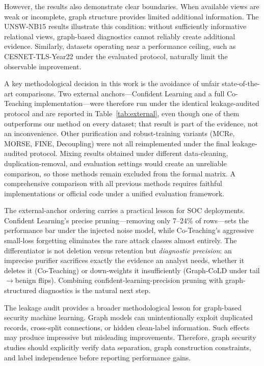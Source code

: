 \documentclass[preprint,3p,times]{elsarticle}
\begin{document}
However, the results also demonstrate clear boundaries. When available views
are weak or incomplete, graph structure provides limited additional information.
The UNSW-NB15 results illustrate this condition: without sufficiently
informative relational views, graph-based diagnostics cannot reliably create
additional evidence. Similarly, datasets operating near a performance ceiling,
such as CESNET-TLS-Year22 under the evaluated protocol, naturally limit the
observable improvement.

A key methodological decision in this work is the avoidance of unfair
state-of-the-art comparisons. Two external anchors---Confident Learning and a
full Co-Teaching implementation---were therefore run under the identical
leakage-audited protocol and are reported in Table~\ref{tab:external}, even
though one of them outperforms our method on every dataset; that result is part
of the evidence, not an inconvenience. Other purification and robust-training
variants (MCRe, MORSE, FINE, Decoupling) were not all
reimplemented under the final leakage-audited protocol. Mixing results obtained
under different data-cleaning, duplication-removal, and evaluation settings
would create an unreliable comparison, so those methods remain excluded from
the formal matrix. A comprehensive comparison with all previous methods
requires faithful implementations or official code under a unified evaluation
framework.

The external-anchor ordering carries a practical lesson for SOC deployments.
Confident Learning's precise pruning---removing only 7--24\% of rows---sets the
performance bar under the injected noise model, while Co-Teaching's aggressive
small-loss forgetting eliminates the rare attack classes almost entirely. The
differentiator is not deletion versus retention but \emph{diagnostic precision}:
an imprecise purifier sacrifices exactly the evidence an analyst needs, whether
it deletes it (Co-Teaching) or down-weights it insufficiently (Graph-CoLD under
tail$\to$benign flips). Combining confident-learning-precision pruning with
graph-structured diagnostics is the natural next step.

The leakage audit provides a broader methodological lesson for graph-based
security machine learning. Graph models can unintentionally exploit duplicated
records, cross-split connections, or hidden clean-label information. Such
effects may produce impressive but misleading improvements. Therefore, graph
security studies should explicitly verify data separation, graph construction
constraints, and label independence before reporting performance gains.
\end{document}
